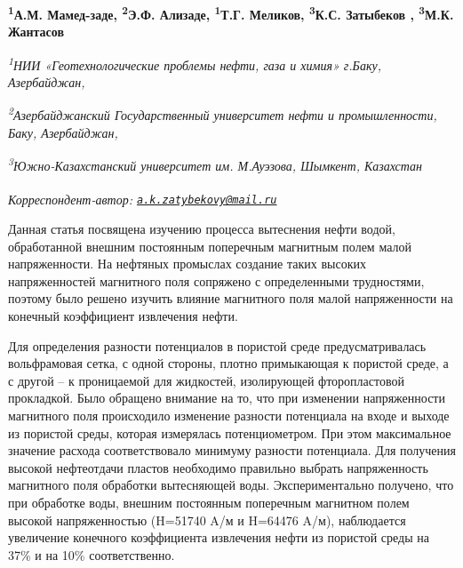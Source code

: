 
\begin{articleheader}

{\bfseries
\textsuperscript{1}А.М. Мамед-заде,
\textsuperscript{2}Э.Ф. Ализаде,
\textsuperscript{1}Т.Г. Меликов,
\textsuperscript{3}К.С. Затыбеков\textsuperscript{\envelope } ,
\textsuperscript{3}М.К. Жантасов}
\end{articleheader}

\begin{affiliation}
\emph{\textsuperscript{1}НИИ «Геотехнологические проблемы нефти, газа и химия» г.Баку, Азербайджан,}

\emph{\textsuperscript{2}Азербайджанский Государственный университет нефти и промышленности, Баку, Азербайджан,}

\emph{\textsuperscript{3}Южно-Казахстанский университет им. М.Ауэзова, Шымкент, Казахстан}

\raggedright \textsuperscript{\envelope }{\em Корреспондент-автор: \href{mailto:a.k.zatybekovy@mail.ru}{\nolinkurl{a.k.zatybekovy@mail.ru}}}
\end{affiliation}

Данная статья посвящена изучению процесса вытеснения нефти водой,
обработанной внешним постоянным поперечным магнитным полем малой
напряженности. На нефтяных промыслах создание таких высоких
напряженностей магнитного поля сопряжено с определенными трудностями,
поэтому было решено изучить влияние магнитного поля малой напряженности
на конечный коэффициент извлечения нефти.

Для определения разности потенциалов в пористой среде предусматривалась
вольфрамовая сетка, с одной стороны, плотно примыкающая к пористой
среде, а с другой -- к проницаемой для жидкостей, изолирующей
фторопластовой прокладкой. Было обращено внимание на то, что при
изменении напряженности магнитного поля происходило изменение разности
потенциала на входе и выходе из пористой среды, которая измерялась
потенциометром. При этом максимальное значение расхода соответствовало
минимуму разности потенциала. Для получения высокой нефтеотдачи пластов
необходимо правильно выбрать напряженность магнитного поля обработки
вытесняющей воды. Экспериментально получено, что при обработке воды,
внешним постоянным поперечным магнитном полем высокой напряженностью
(H=51740 A/м и H=64476 A/м), наблюдается увеличение конечного
коэффициента извлечения нефти из пористой среды на 37\% и на 10\%
соответственно.

